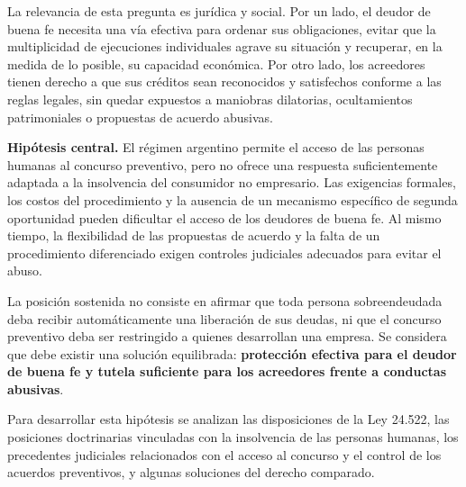 \documentclass[12pt,oneside]{book}
\begin{document}
La relevancia de esta pregunta es jurídica y social. Por un lado, el deudor de buena fe necesita una vía efectiva para ordenar sus obligaciones, evitar que la multiplicidad de ejecuciones individuales agrave su situación y recuperar, en la medida de lo posible, su capacidad económica. Por otro lado, los acreedores tienen derecho a que sus créditos sean reconocidos y satisfechos conforme a las reglas legales, sin quedar expuestos a maniobras dilatorias, ocultamientos patrimoniales o propuestas de acuerdo abusivas.

\begin{important}
\textbf{Hipótesis central.} El régimen argentino permite el acceso de las personas humanas al concurso preventivo, pero no ofrece una respuesta suficientemente adaptada a la insolvencia del consumidor no empresario. Las exigencias formales, los costos del procedimiento y la ausencia de un mecanismo específico de segunda oportunidad pueden dificultar el acceso de los deudores de buena fe. Al mismo tiempo, la flexibilidad de las propuestas de acuerdo y la falta de un procedimiento diferenciado exigen controles judiciales adecuados para evitar el abuso.
\end{important}

La posición sostenida no consiste en afirmar que toda persona sobreendeudada deba recibir automáticamente una liberación de sus deudas, ni que el concurso preventivo deba ser restringido a quienes desarrollan una empresa. Se considera que debe existir una solución equilibrada: \textbf{protección efectiva para el deudor de buena fe y tutela suficiente para los acreedores frente a conductas abusivas}.

Para desarrollar esta hipótesis se analizan las disposiciones de la Ley 24.522, las posiciones doctrinarias vinculadas con la insolvencia de las personas humanas, los precedentes judiciales relacionados con el acceso al concurso y el control de los acuerdos preventivos, y algunas soluciones del derecho comparado.
\end{document}

